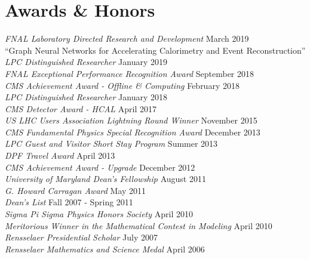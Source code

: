 \section{Awards \& Honors}
{\sl FNAL Laboratory Directed Research and Development} \hfill March 2019\\
``Graph Neural Networks for Accelerating Calorimetry and Event Reconstruction''\\
{\sl LPC Distinguished Researcher} \hfill January 2019\\
{\sl FNAL Exceptional Performance Recognition Award} \hfill September 2018\\
{\sl CMS Achievement Award - Offline \& Computing} \hfill February 2018\\
{\sl LPC Distinguished Researcher} \hfill January 2018\\
{\sl CMS Detector Award - HCAL } \hfill April 2017\\
\ifdefined\longflag
{\sl US LHC Users Association Lightning Round Winner} \hfill November 2015\\
\fi
{\sl CMS Fundamental Physics Special Recognition Award} \hfill December 2013\\
\ifdefined\longestflag
{\sl LPC Guest and Visitor Short Stay Program} \hfill Summer 2013\\
{\sl DPF Travel Award} \hfill April 2013\\
\fi
{\sl CMS Achievement Award - Upgrade} \hfill December 2012\\
\ifdefined\longerflag
{\sl University of Maryland Dean's Fellowship} \hfill August 2011\\
\fi
{\sl G. Howard Carragan Award} \hfill May 2011%
\ifdefined\longflag
\\
\ifdefined\longerflag
{\sl Dean's List} \hfill Fall 2007 - Spring 2011\\
\fi
{\sl Sigma Pi Sigma Physics Honors Society} \hfill April 2010\\
{\sl Meritorious Winner in the Mathematical Contest in Modeling} \hfill April 2010\\
{\sl Rensselaer Presidential Scholar} \hfill July 2007\\
{\sl Rensselaer Mathematics and Science Medal} \hfill April 2006%
\fi